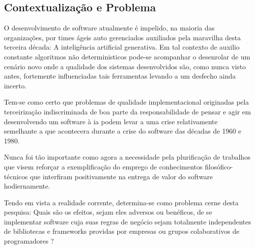 

\subsection{\textbf{Contextualização e Problema}}
    \label{subsec:contextualizacao-problema}

    O desenvolvimento de software atualmente é impelido, na maioria das organizações,
    por times ágeis auto gerenciados auxiliados pela maravilha desta terceira década:
    A inteligência artificial generativa. Em tal contexto de auxilio constante algoritmos
    não deterministicos pode-se acompanhar o desenrolar de um cenário novo onde a
    qualidade dos sistemas desenvolvidos são, como nunca visto antes, fortemente
    influenciadas tais ferramentas levando a um desfecho ainda incerto.

    Tem-se como certo que problemas de qualidade implementacional originadas pela terceirização
    indiscriminada de boa parte da responsabilidade de pensar e agir em desenvolvendo um software
    à \ac{ia} podem levar a uma crise relativamente semelhante a que acontecera
    durante a crise do software das décadas de 1960 e 1980.

    Nunca foi tão importante como agora a necessidade pela plurificação de trabalhos que
    visem reforçar a exemplificação do emprego de conhecimentos filosófico-técnicos que
    interfiram positivamente na entrega de valor do software hodiernamente.

    Tendo em vista a realidade corrente, determina-se como problema cerne desta pesquisa: Quais
    são os efeitos, sejam eles adversos ou benéficos, de se implementar software
    cuja suas regras de negócio sejam totalmente independentes de bibliotecas e frameworks
    providas por empresas ou grupos colaborativos de programadores ?

    

